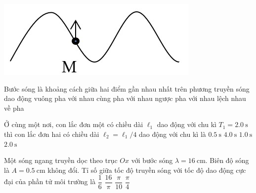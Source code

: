 \begin{ex}
	{\includegraphics[scale=0.65]{../figs/G11-FINAL-SEM1-001-2}}
	\loigiai{}
\end{ex}
\begin{ex}
Bước sóng là khoảng cách giữa hai điểm gần nhau nhất trên phương truyền sóng dao động
	\choice
	{vuông pha với nhau}
	{\True cùng pha với nhau}
	{ngược pha với nhau}
	{lệch nhau về pha}
	\loigiai{}
\end{ex}
\begin{ex}
Ở cùng một nơi, con lắc đơn một có chiều dài $\ell_1$ dao động với chu kì $T_1=\SI{2.0}{\second}$ thì con lắc đơn hai có chiều dài $\ell_2=\ell_1/4$ dao động với chu kì là
	\choice
	{$\SI{0.5}{\second}$}
	{$\SI{4.0}{\second}$}
	{\True $\SI{1.0}{\second}$}
	{$\SI{2.0}{\second}$}
\end{ex}
\begin{ex}
Một sóng ngang truyền dọc theo trục $Ox$ với bước sóng $\lambda=\SI{16}{\centi\meter}$. Biên độ sóng là $A=\SI{0.5}{\centi\meter}$ không đổi. Tỉ số giữa tốc độ truyền sóng với tốc độ dao động cực đại của phần tử môi trường là
	\choice
	{$\dfrac{1}{6}$}
	{\True $\dfrac{16}{\pi}$}
	{$\dfrac{\pi}{10}$}
	{$\dfrac{\pi}{4}$}
\end{ex}
